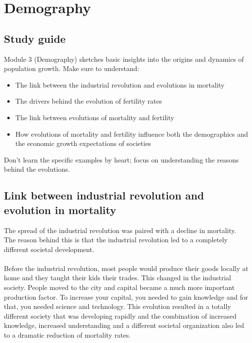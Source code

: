\documentclass[../summary.tex]{subfiles}
\begin{document}
	
	\section{Demography}
	
	\subsection{Study guide}
	
	Module 3 (Demography) sketches basic insights into the origins and dynamics of population growth. Make sure to understand:
	\begin{itemize}
		\item The link between the industrial revolution and evolutions in mortality
		\item The drivers behind the evolution of fertility rates
		\item The link between evolutions of mortality and fertility
		\item How evolutions of mortality and fertility influence both the demographics and the economic
		growth expectations of societies
	\end{itemize}
	Don’t learn the specific examples by heart; focus on understanding the reasons behind the evolutions.
	
	\subsection{Link between industrial revolution and evolution in mortality}
	The spread of the industrial revolution was paired with a decline in mortality. The reason behind this is that the industrial revolution led to a completely different societal development. 
	\\
	\\
	Before the industrial revolution, most people would produce their goods locally at home and they taught their kids their trades. This changed in the industrial society. People moved to the city and capital became a much more important production factor. To increase your capital, you needed to gain knowledge and for that, you needed science and technology. This evolution resulted in a totally different society that was developing rapidly and the combination of increased knowledge, increased understanding and a different societal organization also led to a dramatic reduction of mortality rates. 
	
\end{document}
